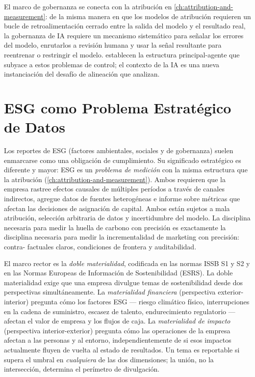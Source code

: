 El marco de gobernanza se conecta con la atribución en \cref{ch:attribution-and-measurement}: de la
misma manera en que los modelos de atribución requieren un bucle de retroalimentación cerrado entre
la salida del modelo y el resultado real, la gobernanza de IA requiere un mecanismo sistemático para
señalar los errores del modelo, enrutarlos a revisión humana y usar la señal resultante para
reentrenar o restringir el modelo. \textcite{jensen1976agency} establecen la estructura
principal-agente que subyace a estos problemas de control; el contexto de la IA es una nueva
instanciación del desafío de alineación que analizan.

\section{ESG como Problema Estratégico de Datos}\label{sec:esg-data}

Los reportes de ESG (factores ambientales, sociales y de gobernanza) suelen enmarcarse como una
obligación de cumplimiento. Su significado estratégico es diferente y mayor: ESG es un \emph{problema
de medición} con la misma estructura que la atribución (\cref{ch:attribution-and-measurement}).
Ambos requieren que la empresa rastree efectos causales de múltiples períodos a través de canales
indirectos, agregue datos de fuentes heterogéneas e informe sobre métricas que afectan las decisiones
de asignación de capital. Ambos están sujetos a mala atribución, selección arbitraria de datos y
incertidumbre del modelo. La disciplina necesaria para medir la huella de carbono con precisión es
exactamente la disciplina necesaria para medir la incrementalidad de marketing con precisión: contra-
factuales claros, condiciones de frontera y auditabilidad.

El marco rector es la \emph{doble materialidad}, codificada en las normas ISSB S1 y S2 y en las
Normas Europeas de Información de Sostenibilidad (ESRS). La doble materialidad exige que una empresa
divulgue temas de sostenibilidad desde dos perspectivas simultáneamente. La \emph{materialidad
financiera} (perspectiva exterior-interior) pregunta cómo los factores ESG — riesgo climático
físico, interrupciones en la cadena de suministro, escasez de talento, endurecimiento regulatorio —
afectan el valor de empresa y los flujos de caja. La \emph{materialidad de impacto} (perspectiva
interior-exterior) pregunta cómo las operaciones de la empresa afectan a las personas y al entorno,
independientemente de si esos impactos actualmente fluyen de vuelta al estado de resultados. Un tema
es reportable si supera el umbral en \emph{cualquiera} de las dos dimensiones; la unión, no la
intersección, determina el perímetro de divulgación.

